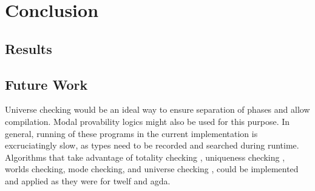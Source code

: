 \chapter{Conclusion}

\section{Results}


\section{Future Work}

Universe checking would be an ideal way to ensure separation of phases and allow compilation. 
Modal provability logics might also be used for this purpose.  
In general, running of these programs in the current implementation is excruciatingly slow, 
as types need to be recorded and searched during runtime.  
Algorithms that take advantage of totality checking \citep{altenkirch2010termination}, 
uniqueness checking \citep{anderson2004verifying}, 
worlds checking\citep{anderson2004verifying}, 
mode checking\citep{anderson2004verifying}, 
and universe checking \citep{harper1991type}, 
could be implemented and applied as they were for twelf and agda.  